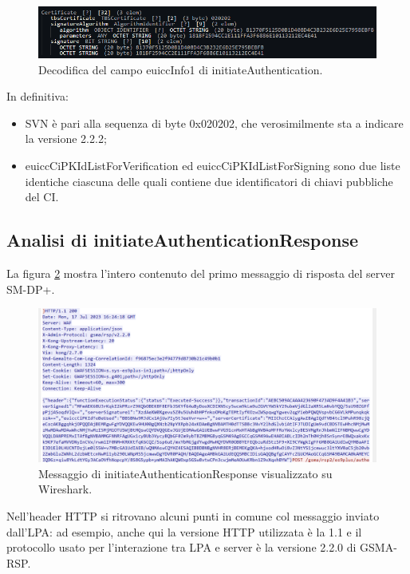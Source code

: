 \documentclass[10pt, oneside]{book}
\begin{document}
\begin{figure}
\includegraphics[width=\linewidth]{decode-euiccInfo1.png}
\caption{Decodifica del campo euiccInfo1 di initiateAuthentication.}
\label{fig:decode-euiccInfo1}
\end{figure}
In definitiva:
\begin{itemize}
\item SVN è pari alla sequenza di byte 0x020202, che verosimilmente sta a indicare la versione 2.2.2;
\item euiccCiPKIdListForVerification ed euiccCiPKIdListForSigning sono due liste identiche ciascuna delle quali contiene due identificatori di chiavi pubbliche del CI.
\end{itemize}

\subsection{Analisi di initiateAuthenticationResponse}
La figura \ref{fig:msg2-stream-pcap} mostra l'intero contenuto del primo messaggio di risposta del server SM-DP+.\\
\begin{figure}
\includegraphics[width=\linewidth]{msg2-stream-pcap.png}
\caption{Messaggio di initiateAuthenticationResponse visualizzato su Wireshark.}
\label{fig:msg2-stream-pcap}
\end{figure}
Nell'header HTTP si ritrovano alcuni punti in comune col messaggio inviato dall'LPA: ad esempio, anche qui la versione HTTP utilizzata è la 1.1 e il protocollo usato per l'interazione tra LPA e server è la versione 2.2.0 di GSMA-RSP.\\
\end{document}
